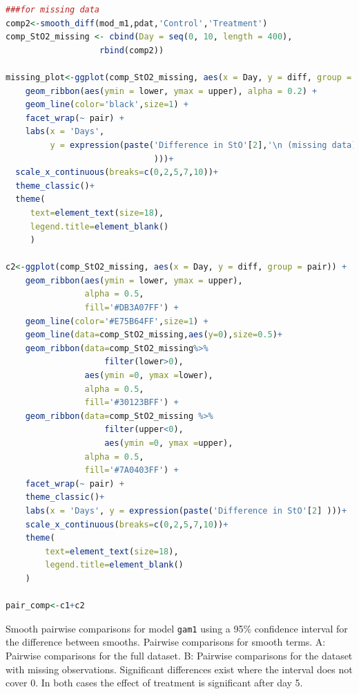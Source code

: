 \documentclass[
]{article}
\newcommand{\passthrough}[1]{#1}
\begin{document}
\begin{lstlisting}[language=R]
###for missing data
comp2<-smooth_diff(mod_m1,pdat,'Control','Treatment')
comp_StO2_missing <- cbind(Day = seq(0, 10, length = 400),
                   rbind(comp2))

missing_plot<-ggplot(comp_StO2_missing, aes(x = Day, y = diff, group = pair)) +
    geom_ribbon(aes(ymin = lower, ymax = upper), alpha = 0.2) +
    geom_line(color='black',size=1) +
    facet_wrap(~ pair) +
    labs(x = 'Days', 
         y = expression(paste('Difference in StO'[2],'\n (missing data)' 
                              )))+
  scale_x_continuous(breaks=c(0,2,5,7,10))+
  theme_classic()+
  theme(
     text=element_text(size=18),
     legend.title=element_blank()
     )

c2<-ggplot(comp_StO2_missing, aes(x = Day, y = diff, group = pair)) +
    geom_ribbon(aes(ymin = lower, ymax = upper),
                alpha = 0.5,
                fill='#DB3A07FF') +
    geom_line(color='#E75B64FF',size=1) +
    geom_line(data=comp_StO2_missing,aes(y=0),size=0.5)+
    geom_ribbon(data=comp_StO2_missing%>%
                    filter(lower>0),
                aes(ymin =0, ymax =lower),
                alpha = 0.5,
                fill='#30123BFF') +
    geom_ribbon(data=comp_StO2_missing %>%
                    filter(upper<0),
                    aes(ymin =0, ymax =upper),
                alpha = 0.5,
                fill='#7A0403FF') +
    facet_wrap(~ pair) +
    theme_classic()+
    labs(x = 'Days', y = expression(paste('Difference in StO'[2] )))+
    scale_x_continuous(breaks=c(0,2,5,7,10))+
    theme(
        text=element_text(size=18),
        legend.title=element_blank()
    )

pair_comp<-c1+c2
\end{lstlisting}

Smooth pairwise comparisons for model \passthrough{\lstinline!gam1!} using a 95\% confidence interval for the difference between smooths. Pairwise comparisons for smooth terms. A: Pairwise comparisons for the full dataset. B: Pairwise comparisons for the dataset with missing observations. Significant differences exist where the interval does not cover 0. In both cases the effect of treatment is significant after day 5.
\end{document}
